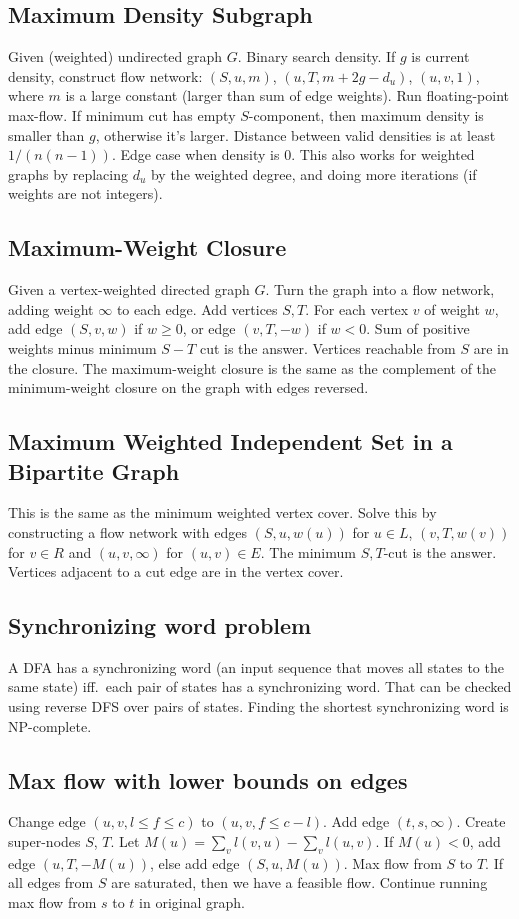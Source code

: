 \documentclass[8pt,a4paper,landscape,oneside]{amsart}
\begin{document}
\begin{multicols*}{3}
  \subsection{Maximum Density Subgraph}
    Given (weighted) undirected graph $G$. Binary search density. If $g$ is
    current density, construct flow network: $(S, u, m)$, $(u, T,
    m+2g-d_u)$, $(u,v,1)$, where $m$ is a large constant (larger than sum
    of edge weights). Run floating-point max-flow. If minimum cut has empty
    $S$-component, then maximum density is smaller than $g$, otherwise it's
    larger. Distance between valid densities is at least $1/(n(n-1))$. Edge
    case when density is $0$. This also works for weighted graphs by
    replacing $d_u$ by the weighted degree, and doing more iterations (if
    weights are not integers).
  \subsection{Maximum-Weight Closure}
    Given a vertex-weighted directed graph $G$. Turn the graph into a flow
    network, adding weight $\infty$ to each edge. Add vertices $S,T$. For
    each vertex $v$ of weight $w$, add edge $(S,v,w)$ if $w\geq 0$, or edge
    $(v,T,-w)$ if $w<0$. Sum of positive weights minus minimum $S-T$ cut is
    the answer. Vertices reachable from $S$ are in the closure. The
    maximum-weight closure is the same as the complement of the
    minimum-weight closure on the graph with edges reversed.
  \subsection{Maximum Weighted Independent Set in a Bipartite Graph}
    This is the same as the minimum weighted vertex cover. Solve this by
    constructing a flow network with edges $(S,u,w(u))$ for $u\in L$,
    $(v,T,w(v))$ for $v\in R$ and $(u,v,\infty)$ for $(u,v)\in E$. The
    minimum $S,T$-cut is the answer. Vertices adjacent to a cut edge are
    in the vertex cover.
  \subsection{Synchronizing word problem}
    A DFA has a synchronizing word (an input sequence that moves all states
    to the same state) iff.\ each pair of states has a synchronizing word.
    That can be checked using reverse DFS over pairs of states. Finding the
    shortest synchronizing word is NP-complete.
  \subsection{Max flow with lower bounds on edges}
    Change edge $(u,v,l\leq f\leq c)$ to $(u,v,f\leq c-l)$. Add edge
    $(t,s,\infty)$. Create super-nodes $S$, $T$. Let $M(u) = \sum_{v}
    l(v,u) - \sum_{v} l(u,v)$. If $M(u)<0$, add edge $(u,T,-M(u))$, else
    add edge $(S,u,M(u))$. Max flow from $S$ to $T$. If all edges from $S$
    are saturated, then we have a feasible flow. Continue running max flow
    from $s$ to $t$ in original graph.

\end{multicols*}
\end{document}
